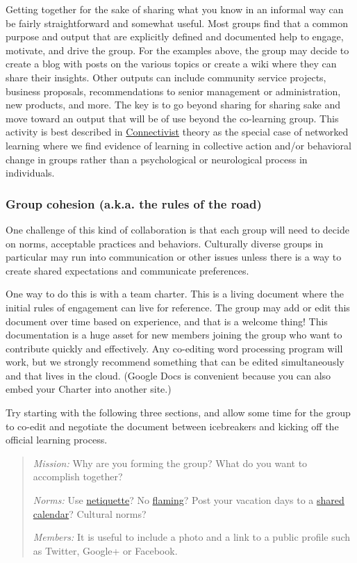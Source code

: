 Getting together for the sake of sharing what you know in an informal
way can be fairly straightforward and somewhat useful. Most groups find
that a common purpose and output that are explicitly defined and
documented help to engage, motivate, and drive the group. For the
examples above, the group may decide to create a blog with posts on the
various topics or create a wiki where they can share their insights.
Other outputs can include community service projects, business
proposals, recommendations to senior management or administration, new
products, and more. The key is to go beyond sharing for sharing sake and
move toward an output that will be of use beyond the co-learning group.
This activity is best described in
\href{http://www.elearnspace.org/Articles/connectivism.htm}{Connectivist}
theory as the special case of networked learning where we find evidence
of learning in collective action and/or behavioral change in groups
rather than a psychological or neurological process in individuals.

\subsubsection{Group cohesion (a.k.a. the rules of the
road)}\label{group-cohesion-a.k.a.-the-rules-of-the-road}

One challenge of this kind of collaboration is that each group will need
to decide on norms, acceptable practices and behaviors. Culturally
diverse groups in particular may run into communication or other issues
unless there is a way to create shared expectations and communicate
preferences.

One way to do this is with a team charter. This is a living document
where the initial rules of engagement can live for reference. The group
may add or edit this document over time based on experience, and that is
a welcome thing! This documentation is a huge asset for new members
joining the group who want to contribute quickly and effectively. Any
co-editing word processing program will work, but we strongly recommend
something that can be edited simultaneously and that lives in the cloud.
(Google Docs is convenient because you can also embed your Charter into
another site.)

Try starting with the following three sections, and allow some time for
the group to co-edit and negotiate the document between icebreakers and
kicking off the official learning process.

\begin{quote}
\emph{Mission:} Why are you forming the group? What do you want to
accomplish together?

\emph{Norms:} Use
\href{http://en.wikipedia.org/wiki/Netiquette\#Netiquette}{netiquette}?
No
\href{http://en.wikipedia.org/wiki/Flaming_\%28Internet\%29}{flaming}?
Post your vacation days to a
\href{http://support.google.com/calendar/bin/answer.py?hl=en\&answer=36598}{shared
calendar}? Cultural norms?

\emph{Members:} It is useful to include a photo and a link to a public
profile such as Twitter, Google+ or Facebook.
\end{quote}

